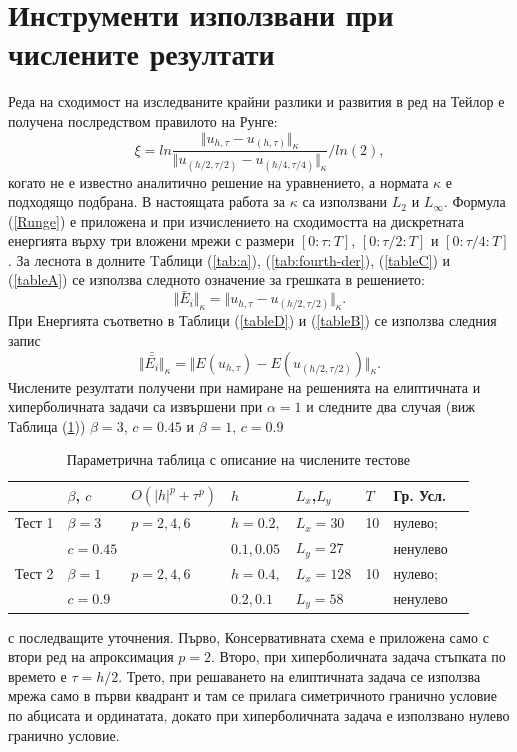 \documentclass{article}
\newcommand{\rf}[1]{(\ref{#1})}
\begin{document}
\section{Инструменти използвани при числените резултати}

Реда на сходимост на изследваните крайни разлики и развития в ред на Тейлор е получена послредством правилото на Рунге:
\begin{equation}\label{Runge}
\xi = ln  \frac{\Vert u_{h,\tau} - u_{(h,\tau)} \Vert_\kappa } {\Vert  u_{(h/2,\tau/2)} - u_{(h/4,\tau/4)} \Vert_\kappa  } / ln(2),
\end{equation}
когато не е известно аналитично решение на уравнението, а нормата $\kappa$ е подходящо подбрана. В настоящата работа за $\kappa$ са използвани $L_2$ и $L_\infty$. Формула \rf{Runge} е приложена и при изчислението на сходимостта на дискретната енергията върху три вложени мрежи с размери $[0:\tau:T]$, $[0:\tau/2:T]$ и $[0:\tau/4:T]$. За леснота в долните Tаблици \rf{tab:a}, \rf{tab:fourth-der}, \rf{tableC} и \rf{tableA} се използва следното означение за грешката в решението:
$$\Vert \bar E_i \Vert_\kappa =  \Vert u_{h,\tau} - u_{(h/2,\tau/2)} \Vert_\kappa.$$ 
При Енергията съответно в Таблици \rf{tableD} и \rf{tableB} се използва следния запис
$$\Vert \bar{\bar{ E_i}} \Vert_\kappa=  \Vert E(u_{h,\tau}) - E(u_{(h/2,\tau/2)}) \Vert_\kappa.$$ 
Числените резултати получени при намиране на решенията на елиптичната и хиперболичната задачи са извършени при $\alpha = 1$ и следните два случая (виж Таблица \rf{tableP}) $\beta = 3$, $c=0.45$ и $\beta = 1$, $c=0.9$ \begin{table}
\centering
\small
		\begin{tabular}{||c|l|l|l|l|l|l|l||}
			\hline
			\hline
          &    $\beta$, $c$ 	 & $O(|h|^p+\tau^p)$   &      $h$       	& $L_x$,$L_y$   	&  $T$    	& Гр. Усл.  \\
   			\hline 
			\hline
Тест 1  &      $\beta = 3$   &      $p=2, 4, 6$    	&    $h=0.2,$       	& $L_x = 30$     	&    10    	&    нулево;  \\
          &      $c=0.45$       &                           	&    $ 0.1, 0.05$   	& $L_y=27	$    	&        		&     ненулево 		\\
	   		\hline
			\hline 
Тест 2	&      $\beta = 1$	&      $p=2, 4, 6$    	&     $h=0.4,$      	& $L_x = 128$    &   10    	&   нулево;  \\
           &      $c=0.9$      	&                       		&      $0.2, 0.1$     & $L_y=58$         	&          		&   ненулево   \\
	   \hline
			\hline 
		\end{tabular}
\caption{Параметрична таблица с описание на числените тестове}
\label{tableP}
\end{table}
с последващите уточнения. Първо, Консервативната схема е приложена само с втори ред на апроксимация  $p=2$. Второ, при хиперболичната задача стъпката по времето е $\tau = h/2$. Трето, при решаването на елиптичната задача се използва мрежа само в първи квадрант и там се прилага симетричното гранично условие по абцисата и ординатата, докато при хиперболичната задача е използвано нулево гранично условие.
\end{document}
